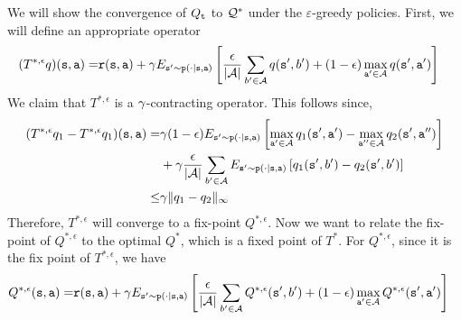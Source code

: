 \begin{advanced}
We will show the convergence of $Q_{\tt t}$ to $\mathcal{Q}^*$ under the $\varepsilon$-greedy policies. First, we will define an appropriate operator
\begin{align*}
  (T^{*,\epsilon}q)({\tt s},{\tt a}) =& {\tt r}({\tt s},{\tt a})+\gamma E_{{\tt s}'\sim{\tt p}(\cdot|{\tt s},{\tt a})}\left[ \frac{\epsilon}{|\mathcal{A}|}\sum_{b'\in\mathcal{A}} q({\tt s}',b')+ (1-\epsilon)\max_{{\tt a}'\in\mathcal{A}}q({\tt s}',{\tt a}')\right] 
\end{align*}
We claim that $T^{*,\epsilon}$ is a $\gamma$-contracting operator. This follows since,
\begin{align*}
    (T^{*,\epsilon}q_1 -  T^{*,\epsilon}q_1)({\tt s},{\tt a}) =& 
    \gamma(1-\epsilon) E_{{\tt s}'\sim{\tt p}(\cdot|{\tt s},{\tt a})}\left[\max_{{\tt a}'\in\mathcal{A}}q_1({\tt s}',{\tt a}')-\max_{{\tt a}''\in\mathcal{A}}q_2({\tt s}',{\tt a}'')\right] \\
    &+\gamma\frac{\epsilon}{|\mathcal{A}|}\sum_{b'\in\mathcal{A}} E_{{\tt s}'\sim{\tt p}(\cdot|{\tt s},{\tt a})}\left[q_1({\tt s}',b')-q_2({\tt s}',b')\right]\\ 
    \leq & \gamma\|q_1-q_2\|_\infty
\end{align*}
Therefore, $T^{*,\epsilon}$ will converge to a fix-point $Q^{*,\epsilon}$. Now we want to relate the fix-point of $Q^{*,\epsilon}$ to the optimal $Q^*$, which is a fixed point of $T^*$.
For $Q^{*,\epsilon}$, since it is the fix point of $T^{*,\epsilon}$, we have
\begin{align*}
  Q^{*,\epsilon}(\state,\action) =&
   \reward(\state,\action)+\discount E_{\state'\sim\transitionprob(\cdot|\state,\action)}\left[ \frac{\epsilon}{|\Actions|}\sum_{b'\in\Actions} Q^{*,\epsilon} (\state',b')+ (1-\epsilon)\max_{\action'\in\Actions}Q^{*,\epsilon} (\state',\action')\right] 

\end{align*}
\end{advanced}
